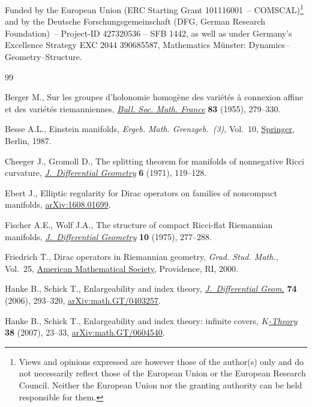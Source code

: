 \documentclass[10pt,a4paper]{amsart}
\numberwithin{equation}{section}
\begin{document}
Funded by the European Union (ERC Starting Grant 101116001~-- COMSCAL)\footnote{Views and opinions expressed are however those of the author(s) only and do not necessarily reflect those of the European Union or the European Research Council. Neither the European Union nor the granting authority can be held responsible for them.}
 and by the Deutsche Forschungsgemeinschaft (DFG, German Research Foundation)~-- Project-ID 427320536 -- SFB 1442, as well as under Germany’s Excellence Strategy EXC 2044 390685587, Mathematics M\"unster: Dynamics--Geometry--Structure.

\begin{thebibliography}{99}
\footnotesize\itemsep=0pt

Berger M., Sur les groupes d'holonomie homog\`ene des vari\'et\'es \`a
 connexion affine et des vari\'et\'es riemanniennes,
 \href{https://doi.org/10.24033/bsmf.1464}{\textit{Bull. Soc. Math. France}}
 \textbf{83} (1955), 279--330.

Besse A.L., Einstein manifolds, \textit{Ergeb. Math. Grenzgeb.~(3)}, Vol.~10,
 \href{https://doi.org/10.1007/978-3-540-74311-8}{Springer}, Berlin, 1987.

Cheeger J., Gromoll D., The splitting theorem for manifolds of nonnegative
 {R}icci curvature,
 \href{https://doi.org/10.4310/jdg/1214430220}{\textit{J.~Differential
 Geometry}} \textbf{6} (1971), 119--128.

Ebert J., Elliptic regularity for Dirac operators on families of noncompact
 manifolds, \href{http://arxiv.org/abs/1608.01699}{arXiv:1608.01699}.

Fischer A.E., Wolf J.A., The structure of compact {R}icci-flat {R}iemannian
 manifolds,
 \href{https://doi.org/10.4310/jdg/1214432794}{\textit{J.~Differential
 Geometry}} \textbf{10} (1975), 277--288.

Friedrich T., Dirac operators in {R}iemannian geometry, \textit{Grad. Stud.
 Math.}, Vol.~25, \href{https://doi.org/10.1090/gsm/025}{American Mathematical
 Society}, Providence, RI, 2000.

Hanke B., Schick T., Enlargeability and index theory,
 \href{https://doi.org/10.4310/jdg/1175266206}{\textit{J.~Differential Geom.}}
 \textbf{74} (2006), 293--320,
 \href{http://arxiv.org/abs/math.GT/0403257}{arXiv:math.GT/0403257}.

Hanke B., Schick T., Enlargeability and index theory: infinite covers,
 \href{https://doi.org/10.1007/s10977-007-9004-3}{\textit{$K$-Theory}}
 \textbf{38} (2007), 23--33,
 \href{http://arxiv.org/abs/math.GT/0604540}{arXiv:math.GT/0604540}.


\end{thebibliography}
\end{document}
